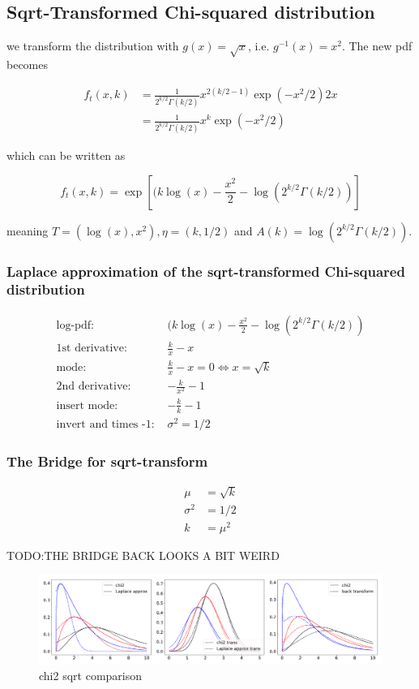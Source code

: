 \subsection{Sqrt-Transformed Chi-squared distribution}

we transform the distribution with $g(x) = \sqrt{x}$, i.e. $g^{-1}(x) = x^2$. The new pdf becomes

\begin{align}
f_t(x,k) &= \frac{1}{2^{k/2}\Gamma(k/2)}  x^{2(k/2 -1)} \exp(-x^2/2)  2x\\ \nonumber
		 &= \frac{1}{2^{k/2}\Gamma(k/2)}  x^{k} \exp(-x^2/2)
\label{eq:chi2_sqrt_trans_pdf}
\end{align}

which can be written as

\begin{equation}
f_t(x, k) = \exp \left[(k\log(x) - \frac{x^2}{2} - \log(2^{k/2}\Gamma(k/2)) \right]
\label{eq:chi2_sqrt_trans_exp_family}
\end{equation}

meaning $T=(\log(x), x^2), \eta=(k, 1/2)$ and $A(k) =  \log(2^{k/2}\Gamma(k/2))$. 

\subsubsection{Laplace approximation of the sqrt-transformed Chi-squared distribution}

\begin{align*}
\text{log-pdf: } &(k\log(x) - \frac{x^2}{2} - \log(2^{k/2}\Gamma(k/2)) \\
\text{1st derivative: }&  \frac{k}{x} -x \\
\text{mode: }& \frac{k}{x} -x = 0 \Leftrightarrow x = \sqrt{k}\\
\text{2nd derivative: }&  -\frac{k}{x^2} - 1\\
\text{insert mode: }& -\frac{k}{k}-1\\
\text{invert and times -1: }&\sigma^2 = 1/2
\end{align*}

\subsubsection{The Bridge for sqrt-transform}

\begin{align}
\mu &= \sqrt{k} \\
\sigma^2 &= 1/2 \\
k &= \mu^2
\end{align}

TODO:THE BRIDGE BACK LOOKS A BIT WEIRD\\

\begin{figure}[!htb]
	\centering
	\includegraphics[width=\textwidth]{figures/chi2_playground_sqrt.pdf}
	\caption{chi2 sqrt comparison}
	\label{fig:chi2_sqrt_comparison}
\end{figure}